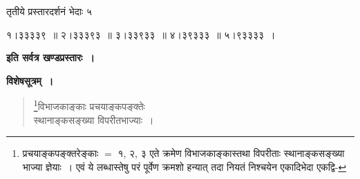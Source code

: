 \documentclass[11pt, openany]{book}
\begin{document}
तृतीये प्रस्तारदर्शनं भेदाः ५
\vspace{2mm}

१।३३३३९~॥ २।३३३९३~॥ ३।३३९३३~॥ ४।३९३३३~॥ ५।९३३३३~।

\begin{center}
\textbf{इति सर्वत्र खण्डप्रस्तारः~।}
\end{center}
\vspace{2mm}

\textbf{विशेषसूत्रम्~।}

\begin{quote}
\renewcommand{\thefootnote}{१}\footnote{प्रचयाङ्कपङ्क्तरेङ्काः $=$ १, २, ३ एते क्रमेण विभाजकाङ्कास्तथा विपरीताः स्थानाङ्कसङ्ख्या भाज्या ज्ञेयाः~। एवं ये लब्धास्तेषु परं पूर्वेण क्रमशो हन्यात् तदा नियतं निश्चयेन एकादिभेदा एकद्वि-}{\gk विभाजकाङ्काः प्रचयाङ्कपङ्क्तेः\\
स्थानाङ्कसङ्ख्या विपरीतभाज्याः~।}
\end{quote}

\newpage
\end{document}
